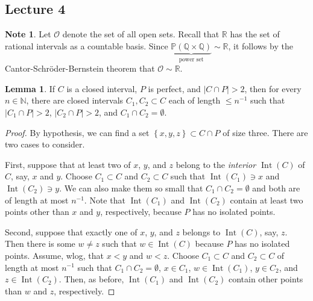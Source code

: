 \documentclass[10pt,letterpaper,cm]{nupset}
\theoremstyle{definition}
\newtheorem{note}[definition]{Note}
\theoremstyle{theorem}
\newtheorem{lemma}[definition]{Lemma}
\theoremstyle{remark}
\newcommand{\N}{\mathbb N}
\renewcommand{\P}{\mathbb P}
\newcommand{\Q}{\mathbb Q}
\newcommand{\R}{\mathbb R}
\newcommand{\1}{\mathbf{1}}
\newcommand{\0}{\vec 0}
\DeclareMathOperator{\Int}{Int}
\begin{document}
\subsection{Lecture 4}

\begin{note}
 Let $\mathcal{O}$ denote the set of all open sets. Recall that $\R$ has the set of rational intervals as a countable basis. Since $ \underbrace{\P(\Q \times \Q)}_{\text{power set}} \sim \R$, it follows by  the Cantor-Schr\"oder-Bernstein theorem that  $\mathcal{O} \sim \R$.
\end{note}

\begin{lemma}\label{PL''}
If $C$ is a closed interval, $P$ is perfect, and $\left\lvert{C \cap P}\right\rvert >  2$, then for every $n \in \N$, there are closed intervals $C_1, C_2 \subset C$ each of length $\leq n^{-1}$ such that $\left\lvert{C_1 \cap P}\right\rvert > 2$, $\left\lvert{C_2 \cap P}\right\rvert > 2$, and $C_1 \cap C_2 =\emptyset$.
\end{lemma}
\begin{proof}
By hypothesis, we can find a set $\left\{x,y, z\right\} \subset C \cap P$ of size three. There are two cases to consider. 

\smallskip
First, suppose that at least two of $x$, $y$, and $z$ belong to the \textit{interior $\Int(C)$} of $C$, say, $x$ and $y$. Choose $C_1\subset C$ and $C_2 \subset C$ such that  $\Int(C_1) \ni x $ and $\Int(C_2) \ni y$. We can also make them so small that $C_1 \cap C_2 =\emptyset$ and both are of length at most $n^{-1}$. Note that $\Int(C_1)$ and $\Int(C_2)$ contain at least two points other than $x$ and $y$, respectively, because $P$ has no isolated points. 

\smallskip

Second, suppose that exactly one of $x$, $y$, and $z$ belongs to $\Int(C)$, say, $z$. Then there is some $w \ne z$ such that $w\in \Int(C)$ because $P$ has no isolated points. Assume, wlog, that $x<y$ and $w<z$. Choose $C_1\subset C$ and $C_2 \subset C$ of length at most $n^{-1}$ such that $C_1\cap C_2 = \emptyset$, $x\in C_1$, $w\in \Int(C_1)$, $y\in C_2$, and $z\in \Int(C_2)$. Then, as before, $\Int(C_1)$ and $\Int(C_2)$ contain other points than $w$ and $z$, respectively. 
\end{proof}
\end{document}
